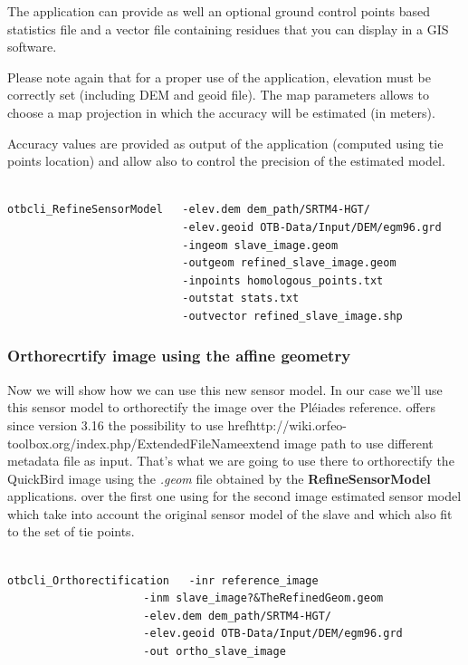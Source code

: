 The application can provide as well an optional ground control points based
statistics file and a vector file containing residues that you can display in a
GIS software.

Please note again that for a proper use of the application, elevation must be
correctly set (including DEM and geoid file). The map parameters allows to
choose a map projection in which the accuracy will be estimated (in meters).

Accuracy values are provided as output of the application (computed using tie
points location) and allow also to control the precision of the estimated model.

\begin{verbatim}

otbcli_RefineSensorModel   -elev.dem dem_path/SRTM4-HGT/
                           -elev.geoid OTB-Data/Input/DEM/egm96.grd
                           -ingeom slave_image.geom
                           -outgeom refined_slave_image.geom
                           -inpoints homologous_points.txt
                           -outstat stats.txt
                           -outvector refined_slave_image.shp

\end{verbatim}

\subsubsection{Orthorecrtify image using the affine geometry}

Now we will show how we can use this new sensor model. In our case we'll use
this sensor model to orthorectify the image over the Pléiades reference. \otb
offers since version 3.16 the possibility to use
href{http://wiki.orfeo-toolbox.org/index.php/ExtendedFileName}{extend image}
path to use different metadata file as input. That's what we are going to use
there to orthorectify the QuickBird image using the \textit{.geom} file obtained
by the \textbf{RefineSensorModel} applications.  over the first one using for
the second image estimated sensor model which take into account the original
sensor model of the slave and which also fit to the set of tie points.

\begin{verbatim}

otbcli_Orthorectification   -inr reference_image
                     -inm slave_image?&TheRefinedGeom.geom
                     -elev.dem dem_path/SRTM4-HGT/
                     -elev.geoid OTB-Data/Input/DEM/egm96.grd
                     -out ortho_slave_image

\end{verbatim}

